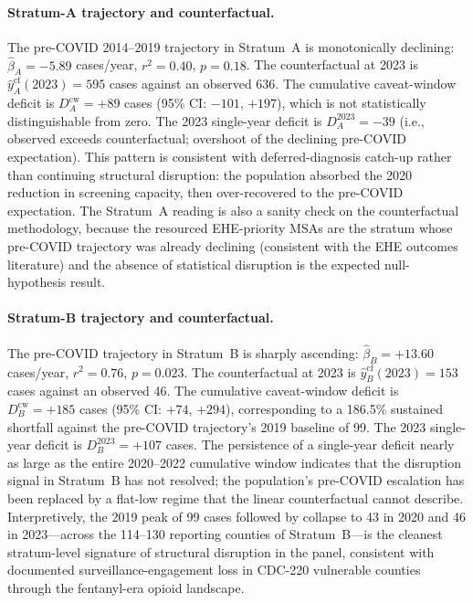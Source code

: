 \documentclass[11pt]{article}
\begin{document}
\paragraph{Stratum-A trajectory and counterfactual.} The pre-COVID 2014--2019 trajectory in Stratum~A is monotonically declining: $\hat\beta_A = -5.89$ cases/year, $r^2 = 0.40$, $p = 0.18$. The counterfactual at 2023 is $\hat{y}_A^{\mathrm{cf}}(2023) = 595$ cases against an observed 636. The cumulative caveat-window deficit is $D_A^{\mathrm{cw}} = +89$ cases (95\% CI: $-101$, $+197$), which is not statistically distinguishable from zero. The 2023 single-year deficit is $D_A^{2023} = -39$ (i.e., observed exceeds counterfactual; overshoot of the declining pre-COVID expectation). This pattern is consistent with deferred-diagnosis catch-up rather than continuing structural disruption: the population absorbed the 2020 reduction in screening capacity, then over-recovered to the pre-COVID expectation. The Stratum~A reading is also a sanity check on the counterfactual methodology, because the resourced EHE-priority MSAs are the stratum whose pre-COVID trajectory was already declining (consistent with the EHE outcomes literature) and the absence of statistical disruption is the expected null-hypothesis result.

\paragraph{Stratum-B trajectory and counterfactual.} The pre-COVID trajectory in Stratum~B is sharply ascending: $\hat\beta_B = +13.60$ cases/year, $r^2 = 0.76$, $p = 0.023$. The counterfactual at 2023 is $\hat{y}_B^{\mathrm{cf}}(2023) = 153$ cases against an observed 46. The cumulative caveat-window deficit is $D_B^{\mathrm{cw}} = +185$ cases (95\% CI: $+74$, $+294$), corresponding to a 186.5\% sustained shortfall against the pre-COVID trajectory's 2019 baseline of 99. The 2023 single-year deficit is $D_B^{2023} = +107$ cases. The persistence of a single-year deficit nearly as large as the entire 2020--2022 cumulative window indicates that the disruption signal in Stratum~B has not resolved; the population's pre-COVID escalation has been replaced by a flat-low regime that the linear counterfactual cannot describe. Interpretively, the 2019 peak of 99 cases followed by collapse to 43 in 2020 and 46 in 2023---across the 114--130 reporting counties of Stratum~B---is the cleanest stratum-level signature of structural disruption in the panel, consistent with documented surveillance-engagement loss in CDC-220 vulnerable counties through the fentanyl-era opioid landscape.
\end{document}
